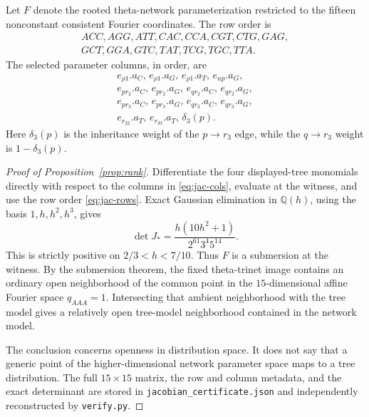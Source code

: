 \documentclass[11pt]{article}
\theoremstyle{remark}
\begin{document}
Let $F$ denote the rooted theta-network parameterization restricted to the fifteen nonconstant consistent Fourier coordinates.  The row order is
\begin{equation}\label{eq:jac-rows}
\begin{gathered}
 ACC,AGG,ATT,CAC,CCA,CGT,CTG,GAG,\\
 GCT,GGA,GTC,TAT,TCG,TGC,TTA.
\end{gathered}
\end{equation}
The selected parameter columns, in order, are
\begin{equation}\label{eq:jac-cols}
\begin{gathered}
 e_{\rho1}.a_C,\,e_{\rho1}.a_G,\,e_{\rho1}.a_T,\,e_{up}.a_G,\\
 e_{pr_2}.a_C,\,e_{pr_2}.a_G,\,e_{qr_2}.a_C,\,e_{qr_2}.a_G,\\
 e_{pr_3}.a_C,\,e_{pr_3}.a_G,\,e_{qr_3}.a_C,\,e_{qr_3}.a_G,\\
 e_{r_22}.a_T,\,e_{r_33}.a_T,\,\delta_3(p).
\end{gathered}
\end{equation}
Here $\delta_3(p)$ is the inheritance weight of the $p\to r_3$ edge, while the $q\to r_3$ weight is $1-\delta_3(p)$.

\begin{proof}[Proof of Proposition~\ref{prop:rank}]
Differentiate the four displayed-tree monomials directly with respect to the columns in \eqref{eq:jac-cols}, evaluate at the witness, and use the row order \eqref{eq:jac-rows}.  Exact Gaussian elimination in $\mathbb{Q}(h)$, using the basis $1,h,h^2,h^3$, gives
\begin{equation}\label{eq:jac-det}
 \det J_*
 =\frac{h(10h^2+1)}{2^{61}3^4 5^{14}}.
\end{equation}
This is strictly positive on $2/3<h<7/10$.  Thus $F$ is a submersion at the witness.  By the submersion theorem, the fixed theta-trinet image contains an ordinary open neighborhood of the common point in the $15$-dimensional affine Fourier space $q_{AAA}=1$.  Intersecting that ambient neighborhood with the tree model gives a relatively open tree-model neighborhood contained in the network model.

The conclusion concerns openness in distribution space.  It does not say that a generic point of the higher-dimensional network parameter space maps to a tree distribution.  The full $15\times15$ matrix, the row and column metadata, and the exact determinant are stored in \texttt{jacobian\_certificate.json} and independently reconstructed by \texttt{verify.py}.
\end{proof}
\end{document}
